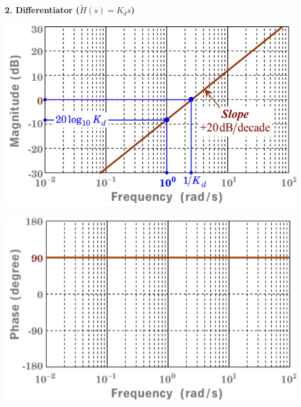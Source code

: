 \documentclass[landscape,a4paper]{extarticle}
\newenvironment{Figure}
  {\par\medskip\noindent\minipage{\linewidth}}
  {\endminipage\par\medskip}
\begin{document}
\begin{multicols*}{5}
    \textbf{2. Differentiator ($\tilde{H}(s) = K_d s$)}
    \begin{Figure}
        \centering
        \includegraphics[width=\linewidth]{bode_differentiator1.png}        
    \end{Figure}
    \begin{Figure}
        \centering
        \includegraphics[width=\linewidth]{bode_differentiator2.png}        
    \end{Figure}


\end{multicols*}
\end{document}
